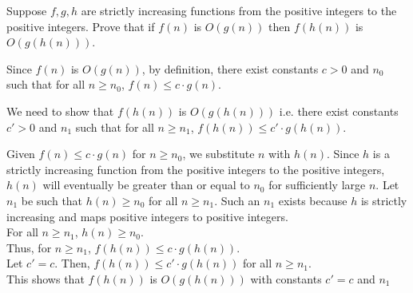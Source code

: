 \documentclass[solution,letterpaper]{cs20}
\begin{document}
\begin{problem}
Suppose $f,g,h$ are strictly increasing functions from the positive
integers to the positive integers. Prove that if $f(n)$ is $O(g(n))$
then $f(h(n))$ is $O(g(h(n)))$. \\
\begin{solution}
Since \( f(n) \) is \( O(g(n)) \), by definition, there exist constants \( c > 0 \) and \( n_0 \) such that for all \( n \geq n_0 \), \( f(n) \leq c \cdot g(n) \).

We need to show that \( f(h(n)) \) is \( O(g(h(n))) \) i.e. there exist constants \( c' > 0 \) and \( n_1 \) such that for all \( n \geq n_1 \), \( f(h(n)) \leq c' \cdot g(h(n)) \).

Given \( f(n) \leq c \cdot g(n) \) for \( n \geq n_0 \), we substitute \( n \) with \( h(n) \). Since \( h \) is a strictly increasing function from the positive integers to the positive integers, \( h(n) \) will eventually be greater than or equal to \( n_0 \) for sufficiently large \( n \). Let \( n_1 \) be such that \( h(n) \geq n_0 \) for all \( n \geq n_1 \). Such an \( n_1 \) exists because \( h \) is strictly increasing and maps positive integers to positive integers. \\
For all \( n \geq n_1 \), \( h(n) \geq n_0 \). \\
Thus, for \( n \geq n_1 \), \( f(h(n)) \leq c \cdot g(h(n)) \). \\
Let \( c' = c \). Then, \( f(h(n)) \leq c' \cdot g(h(n)) \) for all \( n \geq n_1 \). \\
This shows that \( f(h(n)) \) is \( O(g(h(n))) \) with constants \( c' = c \) and \( n_1 \)\\
\end{solution}
\end{problem}
\newpage
\end{document}
